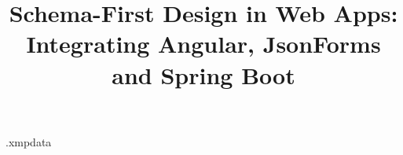 \documentclass{utils/BachelorBUI}
\title{Schema-First Design in Web Apps: Integrating Angular, JsonForms and Spring Boot}
\begin{document}

    \begin{filecontents}[overwrite]{\jobname.xmpdata}
        \makeatletter
        \Title{\@title}
        \Author{\@authorname}
        \Language{\@thesislanguage}
        \Keywords{\@keywords}
        \makeatother
    \end{filecontents}

    \maketitle







    

    \tableofcontents
    
    

    \printbibliography
\end{document}
